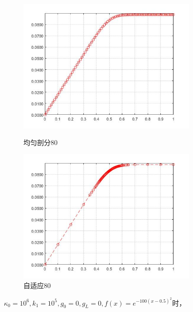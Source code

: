 \documentclass[12pt]{ctexart}
\begin{document}
\begin{figure}[H]
	\centering
	\begin{minipage}[t]{0.48\textwidth}
		\centering
		\includegraphics[width=9cm]{方程一，均匀剖分80.jpg}
		\caption{均匀剖分80}
	\end{minipage}
	\begin{minipage}[t]{0.48\textwidth}
		\centering
		\includegraphics[width=9cm]{方程一，自适应80.jpg}
		\caption{自适应80}
	\end{minipage}
\end{figure}
$\kappa_0=10^6,k_1=10^5,g_0=0,g_L=0,f(x)=e^{-100(x-0.5)^2}$时，\\
\end{document}
